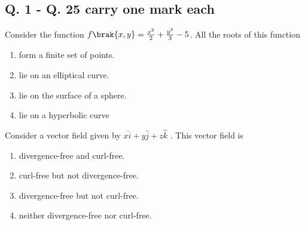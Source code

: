 \subsection{\textbf{Q. 1 - Q. 25 carry one mark each}}
    \item Consider the function $f\brak{x,y} = \frac{x^2}{2}+\frac{y^2}{3} -5$. All the roots of this function
    \begin{enumerate}
\item  form a finite set of points.
\item  lie on an elliptical curve.
\item  lie on the surface of a sphere.
\item  lie on a hyperbolic curve
\end{enumerate}
\item Consider a vector field given by $x\hat{i}+y\hat{j}+z\hat{k}$ . This vector field is
\begin{enumerate}
\item  divergence-free and curl-free.
\item  curl-free but not divergence-free.
\item  divergence-free but not curl-free.
\item  neither divergence-free nor curl-free.
\end{enumerate}

